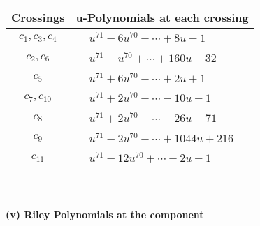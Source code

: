 \documentclass[1p]{elsarticle_modified}
\theoremstyle{definition}
\begin{document}
\begin{tabular}{m{50pt}|m{274pt}}
Crossings & \hspace{64pt}u-Polynomials at each crossing \\
\hline $$\begin{aligned}c_{1},c_{3},c_{4}\end{aligned}$$&$\begin{aligned}
&u^{71}-6 u^{70}+\cdots+8 u-1
\end{aligned}$\\
\hline $$\begin{aligned}c_{2},c_{6}\end{aligned}$$&$\begin{aligned}
&u^{71}- u^{70}+\cdots+160 u-32
\end{aligned}$\\
\hline $$\begin{aligned}c_{5}\end{aligned}$$&$\begin{aligned}
&u^{71}+6 u^{70}+\cdots+2 u+1
\end{aligned}$\\
\hline $$\begin{aligned}c_{7},c_{10}\end{aligned}$$&$\begin{aligned}
&u^{71}+2 u^{70}+\cdots-10 u-1
\end{aligned}$\\
\hline $$\begin{aligned}c_{8}\end{aligned}$$&$\begin{aligned}
&u^{71}+2 u^{70}+\cdots-26 u-71
\end{aligned}$\\
\hline $$\begin{aligned}c_{9}\end{aligned}$$&$\begin{aligned}
&u^{71}-2 u^{70}+\cdots+1044 u+216
\end{aligned}$\\
\hline $$\begin{aligned}c_{11}\end{aligned}$$&$\begin{aligned}
&u^{71}-12 u^{70}+\cdots+2 u-1
\end{aligned}$\\
\hline
\end{tabular}\\~\\
\newpage\renewcommand{\arraystretch}{1}
\flushleft \textbf{(v) Riley Polynomials at the component}\newline \\
\end{document}
